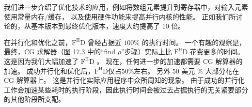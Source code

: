 我们进一步介绍了优化技术的应用，例如将数组元素提升到寄存器中，对输入元素使用常量内存/缓存，
以及使用硬件功能来提高并行内核的性能。 正如我们所讨论的，从基本版本到最终优化版本，速度大约提高了 10 倍。

在并行化和优化之前，$\mathrm{F}^{\mathrm{H}} \mathrm{D}$ 曾经占据近 $100 \%$ 的执行时间。 
一个有趣的观察是，最终，CG 求解器（图 17.3 中的“find $\rho$”步骤）实际上比 $\mathrm{F}^{\mathrm{H}} \mathrm{D}$ 花费更多的时间。 
这是因为我们大幅加速了 $\mathrm{F}^{\mathrm{H}} \mathrm{D}$ 。 现在，任何进一步的加速都需要 CG 解算器的加速。 
成功并行化和优化后，$\mathrm{F}^{\mathrm{H}} \mathrm{D}$仅占$50\%$左右。 
另外 50 美元 \% 大部分花在 CG 解算器上。 这是并行化实际应用程序中众所周知的现象。 
由于成功的并行化工作会加速某些耗时的执行阶段，因此执行时间会被过去占据执行的无关紧要部分的其他阶段所支配。